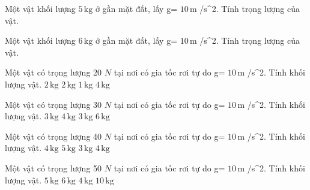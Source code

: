 \begin{bt}
Một vật khối lượng $5\,\text{kg}$ ở gần mặt đất, lấy g= $10\,\text{m}$ /s^2. Tính trọng lượng của vật.
\end{bt}

\begin{bt}
Một vật khối lượng $6\,\text{kg}$ ở gần mặt đất, lấy g= $10\,\text{m}$ /s^2. Tính trọng lượng của vật.
\end{bt}

\begin{ex}
Một vật có trọng lượng 20 $N$ tại nơi có gia tốc rơi tự do g= $10\,\text{m}$ /s^2. Tính khối lượng vật.
\choice
{$2\,\text{kg}$}
{\True $2\,\text{kg}$}
{$1\,\text{kg}$}
{$4\,\text{kg}$}
\end{ex}

\begin{ex}
Một vật có trọng lượng 30 $N$ tại nơi có gia tốc rơi tự do g= $10\,\text{m}$ /s^2. Tính khối lượng vật.
\choice
{$3\,\text{kg}$}
{$4\,\text{kg}$}
{\True $3\,\text{kg}$}
{$6\,\text{kg}$}
\end{ex}

\begin{ex}
Một vật có trọng lượng 40 $N$ tại nơi có gia tốc rơi tự do g= $10\,\text{m}$ /s^2. Tính khối lượng vật.
\choice
{$4\,\text{kg}$}
{$5\,\text{kg}$}
{$3\,\text{kg}$}
{\True $4\,\text{kg}$}
\end{ex}

\begin{ex}
Một vật có trọng lượng 50 $N$ tại nơi có gia tốc rơi tự do g= $10\,\text{m}$ /s^2. Tính khối lượng vật.
\choice
{\True $5\,\text{kg}$}
{$6\,\text{kg}$}
{$4\,\text{kg}$}
{$10\,\text{kg}$}
\end{ex}

